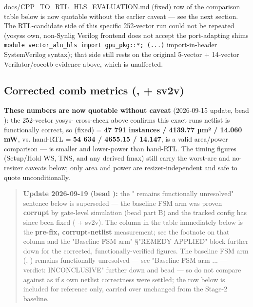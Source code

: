\begin{relocated}{docs/CPP_TO_RTL_HLS_EVALUATION.md}
{ (fixed) row of the comparison table below is now quotable
without the earlier caveat} --- see the next section. The RTL-candidate
side of this specific 252-vector run could not be repeated
(yosys\textquotesingle s own, non-Synlig Verilog frontend does not
accept the port-adapting shim\textquotesingle s
\texttt{module\ vector\_\allowbreak{}alu\_\allowbreak{}hls\ import\ gpu\_\allowbreak{}pkg:\allowbreak{}:\allowbreak{}*;\ (.\allowbreak{}.\allowbreak{}.\allowbreak{})}
import-in-header SystemVerilog syntax); that side still rests on the
original 5-vector + 14-vector Verilator/\allowbreak{}cocotb evidence
above, which is unaffected.

\subsection{\texorpdfstring{Corrected comb metrics
(,  +
sv2v)}{Corrected comb metrics (,  + sv2v)}}\label{tm:dec:cpp-to-rtl-hls-evaluation:corrected-comb-metrics-run-2026-09-15-15-06-29-use-synligfalse-sv2v}

\textbf{These numbers are now quotable without caveat} (2026-09-15
update, bead ): the 252-vector yosys- cross-check
above confirms this exact run\textquotesingle s netlist is functionally
correct, so  (fixed) = \textbf{47 791 instances / 4139.77 µm²
/ 14.060 mW}, vs. hand-RTL  = \textbf{54 634 / 4655.15 /
14.147}, is a valid area/\allowbreak{}power comparison --- 
is smaller and lower-power than hand-RTL. The timing figures
(Setup/\allowbreak{}Hold WS, TNS, and any derived fmax) still carry the
worst-arc and no-resizer caveats below; only area and power are
resizer-independent and safe to quote unconditionally.

\begin{quote}
\warn{} \textbf{Update 2026-09-19 (bead ):} the "
remains functionally unresolved" sentence below is superseded --- the
baseline FSM arm was proven \textbf{corrupt} by gate-level simulation
(bead  part B) and the tracked config has since been fixed
( + sv2v). The  column in the table
immediately below is the \textbf{pre-fix, corrupt-netlist} measurement;
see the footnote on that column and the "Baseline FSM arm" §"REMEDY
APPLIED" block further down for the corrected, functionally-verified
figures. The baseline FSM arm (, )
remains functionally unresolved --- see "Baseline FSM arm ... ---
verdict: INCONCLUSIVE" further down and bead
 --- so do not compare  against
 as if \textquotesingle s own netlist correctness
were settled; the  row below is included for reference only,
carried over unchanged from the Stage-2 baseline.
\end{quote}


\end{relocated}
